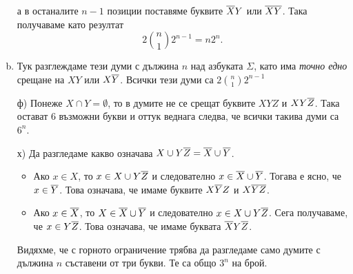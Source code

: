 \begin{hint}
\begin{enumerate}[a)]
    а в останалите $n-1$ позиции поставяме буквите $\overline{X}Y$ или $\overline{X}\overline{Y}$.
    Така получаваме като резултат \[2\binom{n}{1}2^{n-1} = n2^n.\]
  \item
    Тук разглеждаме тези думи с дължина $n$ над азбуката $\Sigma$, като
    има {\em точно едно} срещане на $XY$ или $X\overline{Y}$.
    Всички тези думи са $2\binom{n}{1}2^{n-1}$
  \item[ф)]
    Понеже $X \cap Y = \emptyset$, то в думите не се срещат буквите $XYZ$ и $XY\overline{Z}$.
    Така остават $6$ възможни букви и оттук веднага следва, че всички такива думи са $6^n$.    
  \item[х)]
    Да разгледаме какво означава $X\cup Y\overline{Z} = \overline{X} \cup \overline{Y}$.
    \begin{itemize}
    \item 
      Ако $x \in X$, то $x \in X \cup Y\overline{Z}$ и следователно $x \in \overline{X} \cup \overline{Y}$.
      Тогава е ясно, че $x \in \overline{Y}$. Това означава, че имаме буквите $X\overline{Y}Z$ и $X\overline{Y}\overline{Z}$.
    \item
      Ако $x \in \overline{X}$, то $X \in \overline{X} \cup \overline{Y}$ и следователно $x \in X \cup Y\overline{Z}$.
      Сега получаваме, че $x \in Y\overline{Z}$. Това означава, че имаме буквата $\overline{X}Y\overline{Z}$.
    \end{itemize}
    Видяхме, че с горното ограничение трябва да разгледаме само думите с дължина $n$ съставени от три букви.
    Те са общо $3^n$ на брой.
  \end{enumerate}
\end{hint}


